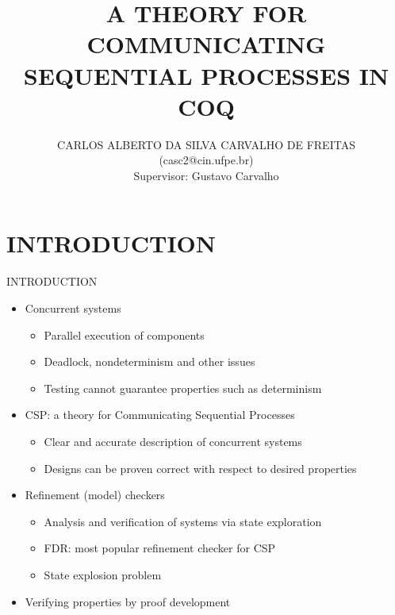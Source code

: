 \documentclass[t]{beamer}
\title[A THEORY FOR CSP IN COQ]
{\large{A THEORY FOR COMMUNICATING \\ SEQUENTIAL PROCESSES IN COQ}}
\author[CARLOS FREITAS]
{
	CARLOS ALBERTO DA SILVA CARVALHO DE FREITAS\\
	(casc2@cin.ufpe.br)\\
	[7mm]{\small Supervisor: Gustavo Carvalho}
}
\institute[]
{
	Universidade Federal de Pernambuco\\
	Centro de Inform\'atica, 50740-560, Brazil\\
}
\date[24th November, 2020]
\begin{document}
\begin{frame}
	\titlepage
\end{frame}

\section*{INTRODUCTION}

\begin{frame}{INTRODUCTION}
	\begin{itemize}
		\item Concurrent systems
		\begin{itemize}
			\item Parallel execution of components
			\item Deadlock, nondeterminism and other issues
			\item Testing cannot guarantee properties such as determinism
		\end{itemize}
		\item CSP: a theory for Communicating Sequential Processes
		\begin{itemize}
			\item Clear and accurate description of concurrent systems
			\item Designs can be proven correct with respect to desired properties
		\end{itemize}
		\item Refinement (model) checkers
		\begin{itemize}
			\item Analysis and verification of systems via state exploration
			\item FDR: most popular refinement checker for CSP
			\item State explosion problem
		\end{itemize}
		\item Verifying properties by proof development
	\end{itemize}
\end{frame}
\end{document}
